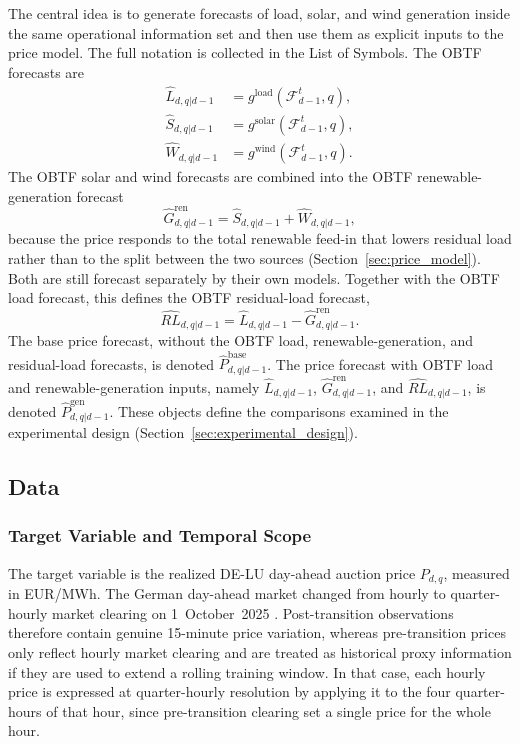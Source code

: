 The central idea is to generate forecasts of load, solar, and wind generation inside the same operational information set and then use them as
explicit inputs to the price model. The full notation is collected in the
List of Symbols. The OBTF forecasts are
\[
\begin{aligned}
  \hat{L}_{d,q|d-1} &= g^{\mathrm{load}}(\mathcal{F}_{d-1}^{t}, q), \\
  \hat{S}_{d,q|d-1} &= g^{\mathrm{solar}}(\mathcal{F}_{d-1}^{t}, q), \\
  \hat{W}_{d,q|d-1} &= g^{\mathrm{wind}}(\mathcal{F}_{d-1}^{t}, q).
\end{aligned}
\]
The OBTF solar and wind forecasts are combined into the OBTF renewable-generation
forecast
\[
  \hat{G}^{\mathrm{ren}}_{d,q|d-1}
  =
  \hat{S}_{d,q|d-1} + \hat{W}_{d,q|d-1},
\]
because the price responds to the total renewable feed-in that lowers residual
load rather than to the split between the two sources
(Section~\ref{sec:price_model}). Both are still forecast separately by their own
models.
Together with the OBTF load forecast, this defines the OBTF residual-load
forecast,
\[
  \widehat{RL}_{d,q|d-1}
  =
  \hat{L}_{d,q|d-1} - \hat{G}^{\mathrm{ren}}_{d,q|d-1}.
\]
The base price forecast, without the OBTF load, renewable-generation, and
residual-load forecasts, is denoted
\(\hat{P}^{\mathrm{base}}_{d,q|d-1}\). The price forecast with OBTF load and renewable-generation inputs, namely \(\hat{L}_{d,q|d-1}\),
\(\hat{G}^{\mathrm{ren}}_{d,q|d-1}\), and
\(\widehat{RL}_{d,q|d-1}\), is denoted
\(\hat{P}^{\mathrm{gen}}_{d,q|d-1}\). These objects define the comparisons
examined in the experimental design
(Section~\ref{sec:experimental_design}).

\subsection{Data}
\label{sec:data}

\subsubsection{Target Variable and Temporal Scope}
\label{sec:target_temporal_scope}

The target variable is the realized \mbox{DE-LU} day-ahead auction price \(P_{d,q}\),
measured in EUR/MWh. The German day-ahead market changed from hourly to
quarter-hourly market clearing on 1~October~2025
\cite{epexSpot15MinuteMarketCoupling}. Post-transition observations therefore
contain genuine 15-minute price variation, whereas pre-transition prices only
reflect hourly market clearing and are treated as historical proxy information
if they are used to extend a rolling training window. In that case, each hourly
price is expressed at quarter-hourly resolution by applying it to the four
quarter-hours of that hour, since pre-transition clearing set a single price for
the whole hour.


